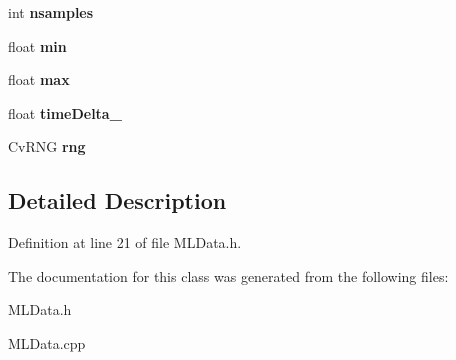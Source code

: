 \begin{DoxyCompactItemize}
\item 
\hypertarget{class_m_l_data_a27537472d2a98ab0953e4274e0eacf26}{int {\bfseries nsamples}}\label{class_m_l_data_a27537472d2a98ab0953e4274e0eacf26}

\item 
\hypertarget{class_m_l_data_aff2c694344818958df194f79569afb5e}{float {\bfseries min}}\label{class_m_l_data_aff2c694344818958df194f79569afb5e}

\item 
\hypertarget{class_m_l_data_a8ab336f56b4c3dad7f07082e7382a09e}{float {\bfseries max}}\label{class_m_l_data_a8ab336f56b4c3dad7f07082e7382a09e}

\item 
\hypertarget{class_m_l_data_a73e0cdc6a204e1ce47f732c539d23386}{float {\bfseries time\-Delta\-\_\-}}\label{class_m_l_data_a73e0cdc6a204e1ce47f732c539d23386}

\item 
\hypertarget{class_m_l_data_acbcee1e8b631c755c2093665354104f2}{Cv\-R\-N\-G {\bfseries rng}}\label{class_m_l_data_acbcee1e8b631c755c2093665354104f2}

\end{DoxyCompactItemize}


\subsection{Detailed Description}


Definition at line 21 of file M\-L\-Data.\-h.



The documentation for this class was generated from the following files\-:\begin{DoxyCompactItemize}
\item 
M\-L\-Data.\-h\item 
M\-L\-Data.\-cpp\end{DoxyCompactItemize}
